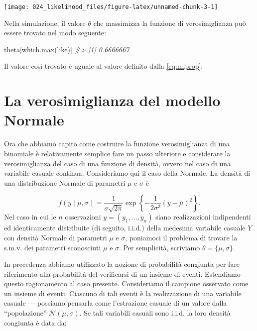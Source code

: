 \documentclass[
]{memoir}
\newenvironment{Shaded}{\begin{snugshade}}{\end{snugshade}}
\newcommand{\CommentTok}[1]{\textcolor[rgb]{0.56,0.35,0.01}{\textit{#1}}}
\newcommand{\FunctionTok}[1]{\textcolor[rgb]{0.00,0.00,0.00}{#1}}
\newcommand{\NormalTok}[1]{#1}
\theoremstyle{definition}
\theoremstyle{definition}
\theoremstyle{definition}
\theoremstyle{definition}
\theoremstyle{remark}
\begin{document}
\begin{center}\texttt{[image: 024\_likelihood\_files/figure-latex/unnamed-chunk-3-1]} \end{center}

Nella simulazione, il valore \(\theta\) che massimizza la funzione di verosimiglianza può essere trovato nel modo seguente:

\begin{Shaded}
\begin{Highlighting}[]
\NormalTok{theta[}\FunctionTok{which.max}\NormalTok{(like)]}
\CommentTok{\#\textgreater{} [1] 0.6666667}
\end{Highlighting}
\end{Shaded}

Il valore così trovato è uguale al valore definito dalla \eqref{eq:mlprop}.

\hypertarget{la-verosimiglianza-del-modello-normale}{%
\section{La verosimiglianza del modello Normale}\label{la-verosimiglianza-del-modello-normale}}

Ora che abbiamo capito come costruire la funzione verosimiglianza di
una binomiale è relativamente semplice fare un passo ulteriore e
considerare la verosimiglianza del caso di una funzione di densità,
ovvero nel caso di una variabile casuale continua. Consideriamo qui il
caso della Normale. La densità di una distribuzione Normale di parametri
\(\mu\) e \(\sigma\) è

\[
f(y \mid \mu, \sigma) = \frac{1}{\sigma \sqrt{2\pi}} \exp\left\{-\frac{1}{2\sigma^2}(y-\mu)^2\right\}.
\label{eq:gausslike}
\]
Nel caso in cui le \(n\) osservazioni \(y = (y_1, \dots, y_n)\) siano realizzazioni indipendenti ed identicamente distribuite (di seguito, i.i.d.) della medesima variabile casuale \(Y\) con densità Normale di parametri \(\mu\) e \(\sigma\), poniamoci il problema di trovare la s.m.v. dei parametri sconosciuti \(\mu\) e \(\sigma\). Per semplicità, scriviamo \(\theta = \{\mu, \sigma\}.\)

In precedenza abbiamo utilizzato la nozione di probabilità congiunta per
fare riferimento alla probabilità del verificarsi di un insieme di
eventi. Estendiamo questo ragionamento al caso presente. Consideriamo il campione osservato come un insieme di eventi. Ciascuno di tali eventi è la realizzazione di una variabile casuale --- possiamo pensarla come l'estrazione casuale di un valore dalla ``popolazione'' \(\mathcal{N}(\mu, \sigma)\). Se tali variabili casuali sono i.i.d. la loro densità congiunta è data da:
\end{document}
